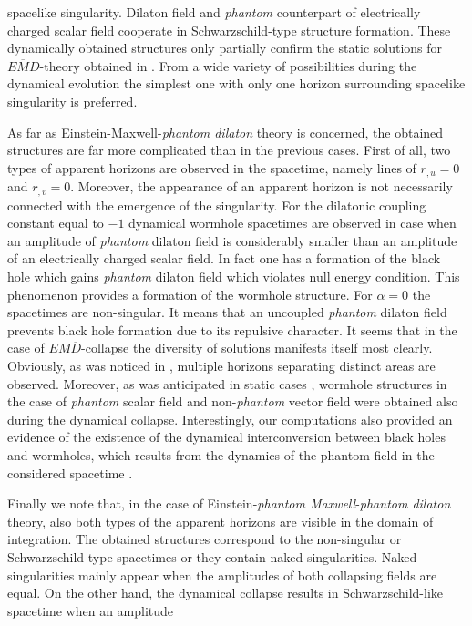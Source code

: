\documentclass[aps,showpacs,nofootinbib,floatfix]{revtex4}
\begin{document}
spacelike singularity. 
Dilaton field and {\it phantom} counterpart of electrically charged scalar field 
cooperate in Schwarzschild-type structure formation.
These dynamically obtained structures only partially confirm the static solutions 
for $E\overline{M}D$-theory obtained in \cite{cle09}. From a wide variety of possibilities during the dynamical 
evolution the simplest one with only one horizon surrounding spacelike singularity is preferred.
\par
As far as Einstein-Maxwell-{\it phantom dilaton} theory is concerned, the obtained structures 
are far more complicated than in the previous cases. 
First of all, two types of apparent horizons are observed in the spacetime, namely lines of $r_{,u}=0$ and $r_{,v}=0$. 
Moreover, the appearance of an apparent horizon is not necessarily
connected with the emergence of the singularity. For the dilatonic coupling constant equal to $-1$ 
dynamical wormhole spacetimes are observed in case when an amplitude of {\it phantom} dilaton field 
is considerably smaller than an amplitude of an 
electrically charged scalar field. In fact one has a formation of 
the black hole which gains {\it phantom} dilaton field which violates null energy condition.
This phenomenon provides a formation of the wormhole structure.
For $\alpha = 0$ the spacetimes are non-singular. It means that an uncoupled 
{\it phantom} dilaton field prevents black hole formation 
due to its repulsive character.
It seems that in the case of $EM\overline{D}$-collapse the diversity of solutions manifests itself most clearly. Obviously, as was noticed in \cite{cle09,cle11}, multiple horizons separating distinct areas are observed. 
Moreover, as was anticipated in static cases \cite{gib96,cle09}, wormhole structures 
in the case of {\it phantom} scalar field and non-{\it phantom} vector field were obtained 
also during the dynamical collapse. Interestingly, our computations also provided an 
evidence of the existence of the dynamical interconversion between black holes and wormholes, which 
results from the dynamics of the phantom field in the considered spacetime \cite{hay09}.
\par
Finally we note that, in the case of Einstein-{\it phantom Maxwell}-{\it phantom dilaton} theory, 
also both types of the apparent horizons are visible in the domain of integration.
The obtained structures 
correspond to the non-singular or Schwarzschild-type spacetimes or they contain naked singularities. 
Naked singularities mainly appear when the amplitudes of both collapsing fields are equal.
On the other hand, the dynamical collapse results in Schwarzschild-like spacetime when an amplitude 
\end{document}
